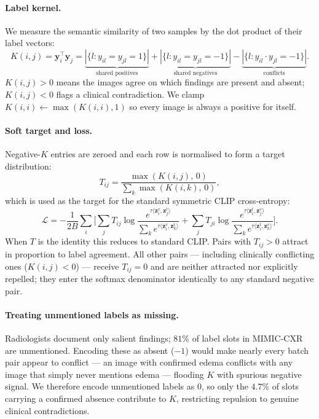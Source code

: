 \documentclass[10pt,twocolumn,letterpaper]{article}
\begin{document}
\paragraph{Label kernel.}
We measure the semantic similarity of two samples by the dot product of their label
vectors:
\begin{equation}
    K(i,j) = \mathbf{y}_i^\top\mathbf{y}_j
    = \underbrace{|\{l:y_{il}=y_{jl}=1\}|}_{\text{shared positives}}
    + \underbrace{|\{l:y_{il}=y_{jl}=-1\}|}_{\text{shared negatives}}
    - \underbrace{|\{l:y_{il}{\cdot}y_{jl}=-1\}|}_{\text{conflicts}}.
    \label{eq:kernel}
\end{equation}
$K(i,j)>0$ means the images agree on which findings are present and absent;
$K(i,j)<0$ flags a clinical contradiction.
We clamp $K(i,i)\leftarrow\max(K(i,i),1)$ so every image is always a positive for itself.

\paragraph{Soft target and loss.}
Negative-$K$ entries are zeroed and each row is normalised to form a target
distribution:
\begin{equation}
    T_{ij} = \frac{\max(K(i,j),\,0)}{\sum_{k}\max(K(i,k),\,0)},
    \label{eq:target}
\end{equation}
which is used as the target for the standard symmetric CLIP cross-entropy:
\begin{equation}
    \mathcal{L} = -\frac{1}{2B}\sum_{i}\Biggl[
        \sum_{j} T_{ij}\log\frac{e^{\tau\langle\mathbf{z}_i^v,\mathbf{z}_j^t\rangle}}
                                {\sum_{k}e^{\tau\langle\mathbf{z}_i^v,\mathbf{z}_k^t\rangle}}
      + \sum_{j} T_{ji}\log\frac{e^{\tau\langle\mathbf{z}_i^t,\mathbf{z}_j^v\rangle}}
                                {\sum_{k}e^{\tau\langle\mathbf{z}_i^t,\mathbf{z}_k^v\rangle}}
    \Biggr].
    \label{eq:loss}
\end{equation}
When $T$ is the identity this reduces to standard CLIP.
Pairs with $T_{ij}>0$ attract in proportion to label agreement. All other pairs --- including clinically conflicting ones ($K(i,j)<0$) --- receive $T_{ij}=0$ and are neither attracted nor explicitly repelled; they enter the softmax denominator identically to any standard negative pair.

\paragraph{Treating unmentioned labels as missing.}
Radiologists document only salient findings; $81\%$ of label slots in MIMIC-CXR are
unmentioned.  Encoding these as absent ($-1$) would make nearly every batch pair
appear to conflict --- an image with confirmed edema conflicts with any image that
simply never mentions edema --- flooding $K$ with spurious negative signal.
We therefore encode unmentioned labels as $0$, so only the $4.7\%$ of slots carrying
a confirmed absence contribute to $K$, restricting repulsion to genuine clinical
contradictions.
\end{document}
